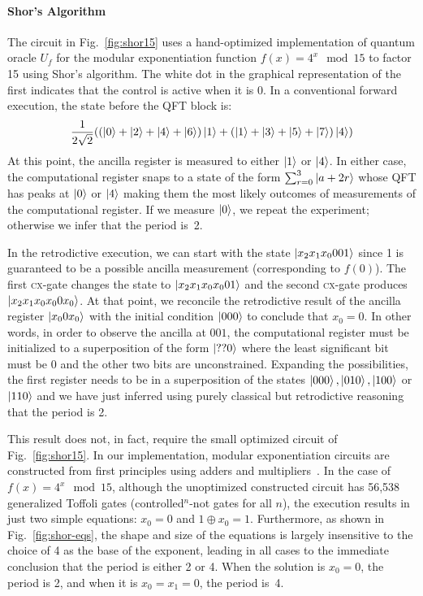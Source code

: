 \documentclass[sigplan]{acmart}
\newcommand{\cx}{\textsc{cx}}
\begin{document}
\paragraph*{Shor's Algorithm}
The circuit in Fig.~\ref{fig:shor15} uses a hand-optimized
implementation of quantum oracle $U_f$ for the modular exponentiation
function $f(x) = 4^x \mod{15}$ to factor 15 using Shor's
algorithm. The white dot in the graphical representation of the first
indicates that the control is active when it is 0. In a conventional
forward execution, the state before the QFT block is:
\[
\frac{1}{2\sqrt{2}} (
  (\ket{0} + \ket{2} + \ket{4} + \ket{6}) \ket{1} + 
  (\ket{1} + \ket{3} + \ket{5} + \ket{7}) \ket{4}
  )
\]
At this point, the ancilla register is measured to either $\ket{1}$ or
$\ket{4}$. In either case, the computational register snaps to a state
of the form $\sum_{r=0}^3 \ket{a+2r}$ whose QFT has peaks at $\ket{0}$
or $\ket{4}$ making them the most likely outcomes of measurements of
the computational register. If we measure $\ket{0}$, we repeat the
experiment; otherwise we infer that the period is~2.

In the retrodictive execution, we can start with the state
$\ket{x_2x_1x_0001}$ since 1 is guaranteed to be a possible ancilla
measurement (corresponding to $f(0)$). The first \cx-gate changes the
state to $\ket{x_2x_1x_0x_001}$ and the second \cx-gate produces
$\ket{x_2x_1x_0x_00x_0}$. At that point, we reconcile the retrodictive
result of the ancilla register $\ket{x_00x_0}$ with the initial
condition $\ket{000}$ to conclude that $x_0=0$. In other words, in
order to observe the ancilla at $001$, the computational register must
be initialized to a superposition of the form $\ket{??0}$ where the
least significant bit must be 0 and the other two bits are
unconstrained. Expanding the possibilities, the first register needs
to be in a superposition of the states $\ket{000}, \ket{010},
\ket{100}$ or $\ket{110}$ and we have just inferred using purely
classical but retrodictive reasoning that the period is
2.

This result does not, in fact, require the small optimized circuit of
Fig.~\ref{fig:shor15}. In our implementation, modular exponentiation
circuits are constructed from first principles using adders and
multipliers~\cite{PhysRevA.54.147}. In the case of $f(x) = 4^x
\mod{15}$, although the unoptimized constructed circuit has 56,538
generalized Toffoli gates (controlled$^{n}$-not gates for all $n$),
the execution results in just two simple equations: $x_0 = 0$ and $1
\oplus x_0 = 1$. Furthermore, as shown in Fig.~\ref{fig:shor-eqs}, the
shape and size of the equations is largely insensitive to the choice
of 4 as the base of the exponent, leading in all cases to the
immediate conclusion that the period is either 2 or 4. When the
solution is $x_0=0$, the period is 2, and when it is $x_0=x_1=0$, the
period is~4.
\end{document}
